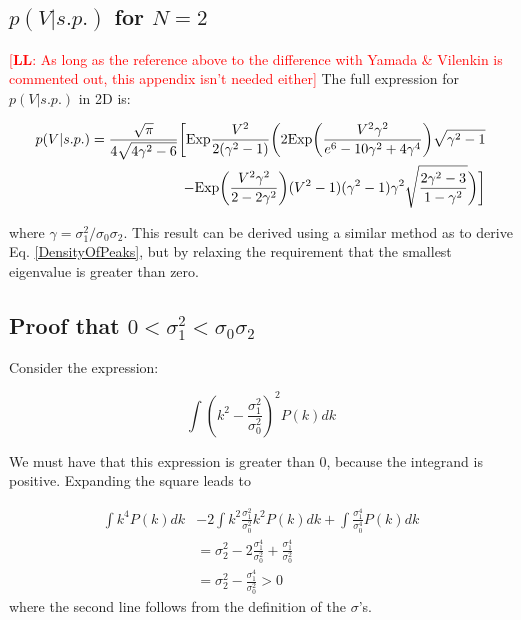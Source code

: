 \documentclass[12pt]{article}
\newcommand{\lfl}[1]{\textcolor{red}{[{\bf LL}: #1]}}
\begin{document}
\subsection{$p(V|s.p.)$ for $N=2$}
\lfl{As long as the reference above to the difference with Yamada \& Vilenkin is commented out, this appendix isn't needed either}
The full expression for $p(V|s.p.)$ in 2D is:

\begin{equation}
\begin{split}
p(V|s.p.)=\frac{\sqrt{\pi}}{4\sqrt{4\gamma^2-6}}\bigg{[}\mathrm{Exp}\frac{V^2}{2(\gamma^2-1)}\bigg{(}2\mathrm{Exp}\bigg{(}\frac{V^2\gamma^2}{e^6-10\gamma^2+4\gamma^4}\bigg{)}\sqrt{\gamma^2-1}\\
-\mathrm{Exp}\bigg{(}\frac{V^2\gamma^2}{2-2\gamma^2}\bigg{)}(V^2-1)(\gamma^2-1)\gamma^2\sqrt{\frac{2\gamma^2-3}{1-\gamma^2}}\bigg{)}\bigg{]}
\end{split}
\end{equation}

\noindent where $\gamma = \sigma_1^2/\sigma_0\sigma_2$. This result can be derived using a similar method as to derive Eq. \ref{DensityOfPeaks}, but by relaxing the requirement that the smallest eigenvalue is greater than zero.

\subsection{Proof that $0 < \sigma_1^2 < \sigma_0\sigma_2$} \label{Proof}

Consider the expression:

\begin{equation}
\int (k^2 - \frac{\sigma_1^2}{\sigma_0^2})^2 P(k) dk
\end{equation}

\noindent We must have that this expression is greater than 0, because the integrand is positive. Expanding the square leads to

\begin{equation}
\begin{split}
\int k^4 P(k) dk &- 2 \int k^2 \frac{\sigma_1^2}{\sigma_0^2}k^2 P(k) dk + \int \frac{\sigma_1^4}{\sigma_0^4} P(k) dk \\
&= \sigma_2^2 - 2 \frac{\sigma_1^4}{\sigma_0^2} + \frac{\sigma_1^4}{\sigma_0^2} \\
&= \sigma_2^2 - \frac{\sigma_1^4}{\sigma_0^2} > 0
\end{split}
\end{equation}
where the second line follows from the definition of the $\sigma$'s.
\end{document}
